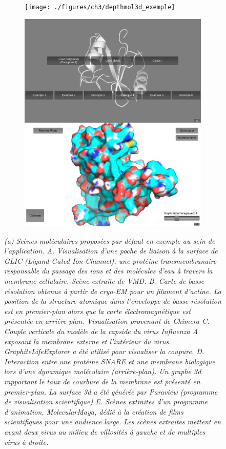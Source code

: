 \begin{figure}
\begin{subfigure}{.5\textwidth}
  \centering
  {\texttt{[image: ./figures/ch3/depthmol3d\_exemple]}}
    \caption{}
  \label{Fig:depthmol3d_exemple}
\end{subfigure}
\begin{subfigure}{.5\textwidth}
  \centering
  {\includegraphics[width=.75\linewidth]{./figures/ch3/depthmol3d_screenshots}}
    \caption{}
  \label{Fig:depthmol3d_screenshots}
\end{subfigure}
\caption{{\it (a) Scènes moléculaires proposées par défaut en exemple au sein de l'application.
A. Visualisation d'une poche de liaison à la surface de GLIC (Ligand-Gated Ion Channel), une protéine transmembranaire responsable du passage des ions et des molécules d'eau à travers la membrane cellulaire. Scène extraite de VMD. B. Carte de basse résolution obtenue à partir de cryo-EM pour un filament d'actine. La position de la structure atomique dans l'enveloppe de basse résolution est en premier-plan alors que la carte électromagnétique est présentée en arrière-plan. Visualisation provenant de Chimera C. Couple verticale du modèle de la capside du virus Influenza A exposant la membrane externe et l'intérieur du virus. GraphiteLifeExplorer a été utilisé pour visualiser la coupure. D. Interaction entre une protéine SNARE et une membrane biologique lors d'une dynamique moléculaire (arrière-plan). Un graphe 3d rapportant le taux de courbure de la membrane est présenté en premier-plan. La surface 3d a été générée par Paraview (programme de visualisation scientifique) E. Scènes extraites d'un programme d'animation, MolecularMaya, dédié à la création de films scientifiques pour une audience large. Les scènes extraites mettent en avant deux virus au milieu de villosités à gauche et de multiples virus à droite.
}}
\end{figure}
